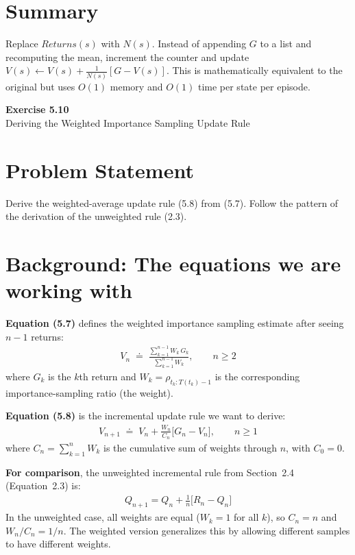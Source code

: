 \documentclass[11pt]{article}
\begin{document}
\section*{Summary}

Replace $Returns(s)$ with $N(s)$. Instead of appending $G$ to a list and recomputing the mean, increment the counter and update $V(s) \leftarrow V(s) + \frac{1}{N(s)}[G - V(s)]$. This is mathematically equivalent to the original but uses $O(1)$ memory and $O(1)$ time per state per episode.

\newpage

\begin{center}
    {\Large\color{garnet}\textbf{Exercise 5.10}}\\[6pt]
    {\large Deriving the Weighted Importance Sampling Update Rule}
\end{center}

\section*{Problem Statement}

Derive the weighted-average update rule (5.8) from (5.7). Follow the pattern of the derivation of the unweighted rule (2.3).

\section*{Background: The equations we are working with}

\textbf{Equation (5.7)} defines the weighted importance sampling estimate after seeing $n - 1$ returns:
\begin{align}
    V_n \;\doteq\; \frac{\sum_{k=1}^{n-1} W_k \, G_k}{\sum_{k=1}^{n-1} W_k}, \qquad n \geq 2 \label{eq:57}
\end{align}
where $G_k$ is the $k$th return and $W_k = \rho_{t_k:T(t_k)-1}$ is the corresponding importance-sampling ratio (the weight).

\textbf{Equation (5.8)} is the incremental update rule we want to derive:
\begin{align}
    V_{n+1} \;\doteq\; V_n + \frac{W_n}{C_n}\Big[G_n - V_n\Big], \qquad n \geq 1 \label{eq:58}
\end{align}
where $C_n = \sum_{k=1}^{n} W_k$ is the cumulative sum of weights through $n$, with $C_0 = 0$.

\textbf{For comparison}, the unweighted incremental rule from Section~2.4 (Equation~2.3) is:
\begin{align}
    Q_{n+1} = Q_n + \frac{1}{n}\Big[R_n - Q_n\Big]
\end{align}
In the unweighted case, all weights are equal ($W_k = 1$ for all $k$), so $C_n = n$ and $W_n / C_n = 1/n$. The weighted version generalizes this by allowing different samples to have different weights.
\end{document}
